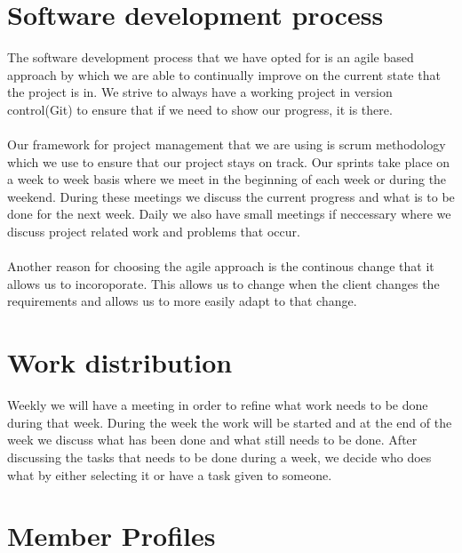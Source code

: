 \documentclass[a4paper,12pt,final]{article}
\begin{document}
\newpage
\section{Software development process}
The software development process that we have opted for is an
agile based approach by which we are able to continually improve 
on the current state that the project is in. We strive to always have
a working project in version control(Git) to ensure that if we need to
show our progress, it is there.\\
\textbf{\\}
Our framework for project management that we are using is scrum methodology 
which we use to ensure that our project stays on track. Our sprints take
place on a week to week basis where we meet in the beginning of each week
or during the weekend. During these meetings we discuss the current
progress and what is to be done for the next week. Daily we
also have small meetings if neccessary where we discuss project related work and problems that occur.\\
\textbf{\\}
Another reason for choosing the agile approach is the continous change that it
allows us to incoroporate. This allows us to change when the client changes the
requirements and allows us to more easily adapt to that change.



\section{Work distribution}
Weekly we will have a meeting in order to refine what work needs to be done during that
week. During the week the work will be started and at the end of the week we discuss
what has been done and what still needs to be done. After discussing the tasks that needs
to be done during a week, we decide who does what by either selecting it or have a task 
given to someone.

\newpage
\section{Member Profiles}
\end{document}
